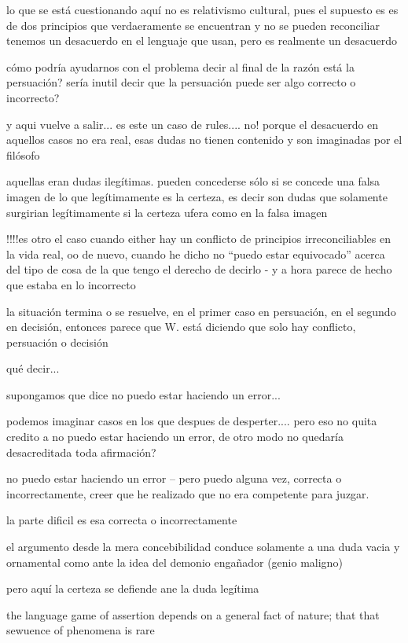 lo que se está cuestionando aquí no es relativismo cultural, pues el supuesto es es de dos principios que verdaeramente se encuentran y no se pueden reconciliar tenemos un desacuerdo en el lenguaje que usan, pero es realmente un desacuerdo

cómo podría ayudarnos con el problema decir al final de la razón está la persuación? sería inutil decir que la persuación puede ser algo correcto o incorrecto?

  y aqui vuelve a salir... es este un caso de rules....
  no! porque el desacuerdo en aquellos casos no era real, esas dudas no tienen contenido y son imaginadas por el filósofo

  aquellas eran dudas ilegítimas. pueden concederse sólo si se concede una falsa imagen de lo que legítimamente es la certeza, es decir son dudas que solamente surgirian legítimamente si la certeza ufera como en la falsa imagen


  !!!!es otro el caso cuando either
  hay un conflicto de principios irreconciliables en la vida real,
  oo
  de nuevo, cuando he dicho no ``puedo estar equivocado'' acerca del tipo de cosa de la que tengo el derecho de decirlo - y a hora parece de hecho que estaba en lo incorrecto

  la situación termina o se resuelve, en el primer caso en persuación, en el segundo en decisión, entonces parece que W. está diciendo que solo hay conflicto, persuación o decisión

  qué decir...

  supongamos que dice no puedo estar haciendo un error...

  podemos imaginar casos en los que despues de desperter.... pero eso no quita credito a no puedo estar haciendo un error, de otro modo no quedaría desacreditada toda afirmación?

  no puedo estar haciendo un error -- pero puedo alguna vez, correcta o incorrectamente, creer que he realizado que no era competente para juzgar.

  la parte dificil es esa correcta o incorrectamente

  el argumento desde la mera concebibilidad conduce solamente a una duda vacia y ornamental como ante la idea del demonio engañador (genio maligno)

  pero aquí la certeza se defiende ane la duda legítima

the language game of assertion depends on a general fact of nature; that that sewuence of phenomena is rare

